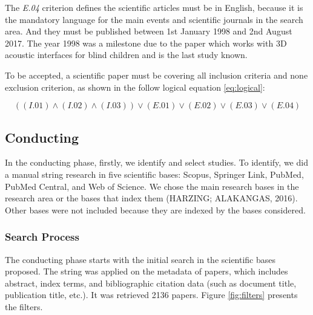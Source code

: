 The \textit{E.04} criterion defines the scientific articles must be in English, because it is the mandatory language for the main events and scientific journals in the search area. And they must be published between 1st January 1998 and 2nd August 2017. The year 1998 was a milestone due to the paper  which works with 3D acoustic interfaces for blind children and is the last study known.

To be accepted, a scientific paper must be covering all inclusion criteria and none exclusion criterion, as shown in the follow logical equation \ref{eq:logical}:

 \begin{equation}
    \label{eq:logical}
	((I.01)\wedge(I.02)\wedge(I.03))\vee(E.01)\vee(E.02)\vee(E.03)\vee(E.04)
 \end{equation}


\subsection{Conducting}
\label{subsec:methodology-conducting}

In the conducting phase, firstly, we identify and select studies. To identify, we did a manual string research in five scientific bases: Scopus, Springer Link, PubMed, PubMed Central, and Web of Science. We chose the main research bases in the research area or the bases that index them (HARZING; ALAKANGAS, 2016). Other bases were not included because they are indexed by the bases considered.

\subsubsection{Search Process}
\label{subsubsec:methodology-conducting-search}

The conducting phase starts with the initial search in the scientific bases proposed. The string was applied on the metadata of papers, which includes abstract, index terms, and bibliographic citation data (such as document title, publication title, etc.). It was retrieved 2136 papers. Figure \ref{fig:filters} presents the filters.

 	\begin{figure}[h] 
   	    \captionsetup{width=16cm}%
	\end{figure}
	

